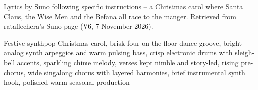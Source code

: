 
\label{sec:celebrate-the-child}
\begin{notes}
Lyrics by Suno following specific instructions -- a Christmas carol where Santa Claus, the Wise Men and the Befana all race to the manger. Retrieved from rataflechera's Suno page (V6, 7 November 2026).
\end{notes}
\begin{style}
Festive synthpop Christmas carol, brisk four-on-the-floor dance groove, bright analog synth arpeggios and warm pulsing bass, crisp electronic drums with sleigh-bell accents, sparkling chime melody, verses kept nimble and story-led, rising pre-chorus, wide singalong chorus with layered harmonies, brief instrumental synth hook, polished warm seasonal production
\end{style}
